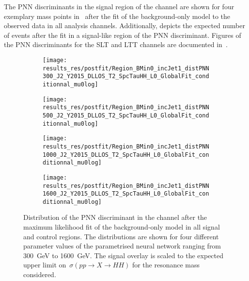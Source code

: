 The PNN discriminants in the signal region of the \hadhad channel are
shown for four exemplary mass points
in~ after the fit of the
background-only model to the observed data in all analysis channels.
Additionally,  depicts the expected
number of events after the fit in a signal-like region of the PNN
discriminant. Figures of the PNN discriminants for the \lephad SLT and
LTT channels are documented in~.

\begin{figure}[htbp]
  \centering

  \begin{subfigure}{0.495\textwidth}
    \centering

    \texttt{[image: results\_res/postfit/Region\_BMin0\_incJet1\_distPNN300\_J2\_Y2015\_DLLOS\_T2\_SpcTauHH\_L0\_GlobalFit\_conditionnal\_mu0log]}
  \end{subfigure}\hfill%
  \begin{subfigure}{0.495\textwidth}
    \centering

    \texttt{[image: results\_res/postfit/Region\_BMin0\_incJet1\_distPNN500\_J2\_Y2015\_DLLOS\_T2\_SpcTauHH\_L0\_GlobalFit\_conditionnal\_mu0log]}
  \end{subfigure}

  \begin{subfigure}{0.495\textwidth}
    \centering

    \texttt{[image: results\_res/postfit/Region\_BMin0\_incJet1\_distPNN1000\_J2\_Y2015\_DLLOS\_T2\_SpcTauHH\_L0\_GlobalFit\_conditionnal\_mu0log]}
    \label{fig:pnn1000_postfit}
  \end{subfigure}\hfill%
  \begin{subfigure}{0.495\textwidth}
    \centering

    \texttt{[image: results\_res/postfit/Region\_BMin0\_incJet1\_distPNN1600\_J2\_Y2015\_DLLOS\_T2\_SpcTauHH\_L0\_GlobalFit\_conditionnal\_mu0log]}
  \end{subfigure}

  \caption{Distribution of the PNN discriminant in the \hadhad channel
    after the maximum likelihood fit of the background-only model in
    all signal and control regions. The distributions are shown for
    four different parameter values of the parametrised neural network
    ranging from \SI{300}{\GeV} to \SI{1600}{\GeV}. The signal overlay
    is scaled to the expected upper limit on~$\sigma(pp \to X \to HH)$
    for the resonance mass considered.}%
  \label{fig:resonant_mva_postfit}
\end{figure}


